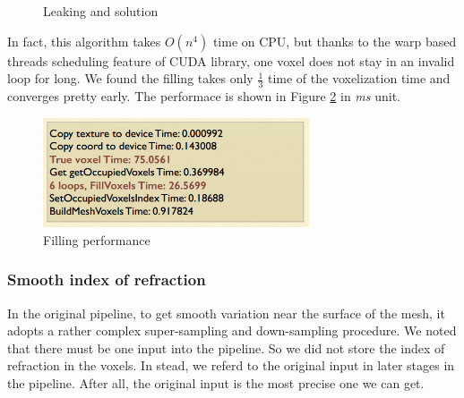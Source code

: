 \documentclass[a4paper]{article}
\begin{document}
\begin{CJK*}{UTF8}{gkai}
\begin{figure}[H]
\centering
{}
\hspace{0in}
\caption{Leaking and solution}
\label{fig:subfig} 
\end{figure}

In fact, this algorithm takes $O(n^4)$ time on CPU, but thanks to the warp based threads scheduling feature of CUDA library, one voxel does not stay in an invalid loop for long. We found the filling takes only $\frac{1}{3}$ time of the voxelization time and converges pretty early. The performace is shown in Figure \ref{fig:fillperformance} in \textit{ms} unit.

\begin{figure}[H]
\centering
\includegraphics[width=0.7\textwidth]{fillperformance.png}
\caption{\label{fig:fillperformance}Filling performance}
\end{figure}


\subsubsection{Smooth index of refraction}
In the original pipeline, to get smooth variation near the surface of the mesh, it adopts a rather complex super-sampling and down-sampling procedure. We noted that there must be one input into the pipeline. So we did not store the index of refraction in the voxels. In stead, we referd to the original input in later stages in the pipeline. After all, the original input is the most precise one we can get. 


\end{CJK*}
\end{document}
